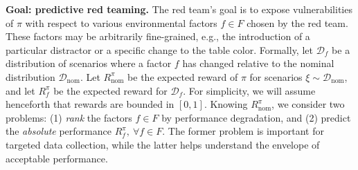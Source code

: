 {\bf Goal: predictive red teaming.} The red team's goal is to expose vulnerabilities of $\pi$ with respect to various environmental factors $f \in F$ chosen by the red team.  These factors may be arbitrarily fine-grained, e.g., the introduction of a particular distractor or a specific change to the table color. Formally, let $\mathcal{D}_f$ be a distribution of scenarios where a factor $f$ has changed relative to the nominal distribution $\mathcal{D}_\text{nom}$. Let $R_\text{nom}^\pi$ be the expected reward of $\pi$ for scenarios $\xi \sim \mathcal{D}_\text{nom}$, and let $R_f^\pi$ be the expected reward for $\mathcal{D}_f$. For simplicity, we will assume henceforth that rewards are bounded in $[0,1]$. Knowing $R_\text{nom}^\pi$, we consider two problems: (1) \emph{rank} the factors $f \in F$ by performance degradation, and (2) predict the \emph{absolute} performance $R_f^\pi, \ \forall f \in F$. The former problem is important for targeted data collection, while the latter helps understand the envelope of acceptable performance.

